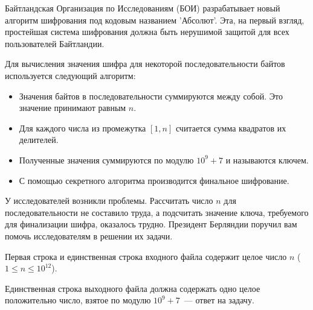 
Байтландская Организация по Исследованиям (БОИ) разрабатывает новый алгоритм шифрования
под кодовым названием 'Абсолют'. Эта, на первый взгляд, простейшая система шифрования должна
быть нерушимой защитой для всех пользователей Байтландии.

Для вычисления значения шифра для некоторой последовательности байтов используется
следующий алгоритм:
\begin{itemize}
    \item Значения байтов в последовательности суммируются между собой. Это значение принимают равным $n$.
    \item Для каждого числа из промежутка $[1, n]$ считается сумма квадратов их делителей.
    \item Полученные значения суммируются по модулю $10^9 + 7$ и называются ключем.
    \item С помощью секретного алгоритма производится финальное шифрование.
\end{itemize}

У исследователей возникли проблемы. Рассчитать число $n$ для последовательности не составило
труда, а подсчитать значение ключа, требуемого для финализации шифра, оказалось трудно.
Президент Берляндии поручил вам помочь исследователям в решении их задачи.

\Input
Первая строка и единственная строка входного файла содержит целое число $n$ ($1 \le n \le 10^{12}$).

\Output
Единственная строка выходного файла должна содержать одно целое положительно число,
взятое по модулю $10^9 + 7$~--- ответ на задачу.

\Samples
\BeginTests
\EndTests

\Scoring


\EndProblem
